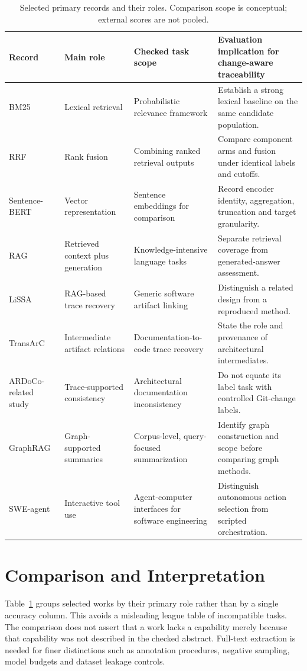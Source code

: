 \documentclass[conference,a4paper]{IEEEtran}
\begin{document}
\begin{table}[!t]
\centering\footnotesize
\caption{Selected primary records and their roles. Comparison scope is conceptual; external scores are not pooled.}
\label{tab:literature}
\begin{tabular}{p{2.4cm}p{3.1cm}p{4.0cm}p{5.7cm}}\toprule
Record & Main role & Checked task scope & Evaluation implication for change-aware traceability \\\midrule
BM25 \cite{bm25} & Lexical retrieval & Probabilistic relevance framework & Establish a strong lexical baseline on the same candidate population. \\
RRF \cite{rrf} & Rank fusion & Combining ranked retrieval outputs & Compare component arms and fusion under identical labels and cutoffs. \\
Sentence-BERT \cite{sbert} & Vector representation & Sentence embeddings for comparison & Record encoder identity, aggregation, truncation and target granularity. \\
RAG \cite{rag} & Retrieved context plus generation & Knowledge-intensive language tasks & Separate retrieval coverage from generated-answer assessment. \\
LiSSA \cite{lissa} & RAG-based trace recovery & Generic software artifact linking & Distinguish a related design from a reproduced method. \\
TransArC \cite{transarc} & Intermediate artifact relations & Documentation-to-code trace recovery & State the role and provenance of architectural intermediates. \\
ARDoCo-related study \cite{ardoco} & Trace-supported consistency & Architectural documentation inconsistency & Do not equate its label task with controlled Git-change labels. \\
GraphRAG \cite{graphrag} & Graph-supported summaries & Corpus-level, query-focused summarization & Identify graph construction and scope before comparing graph methods. \\
SWE-agent \cite{sweagent} & Interactive tool use & Agent-computer interfaces for software engineering & Distinguish autonomous action selection from scripted orchestration. \\\bottomrule
\end{tabular}
\end{table}

\section{Comparison and Interpretation}
Table~\ref{tab:literature} groups selected works by their primary role rather than by a single accuracy column. This avoids a misleading league table of incompatible tasks. The comparison does not assert that a work lacks a capability merely because that capability was not described in the checked abstract. Full-text extraction is needed for finer distinctions such as annotation procedures, negative sampling, model budgets and dataset leakage controls.
\end{document}

